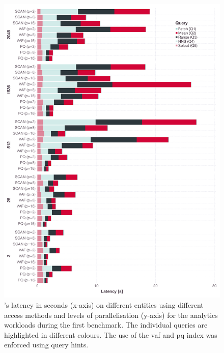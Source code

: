 \begin{figure}[p]
    \centering
    \includegraphics[width=\textwidth]{figures/analytics/analytics-cottontail-runtime}
    \caption {\cottontail{}'s latency in seconds (x-axis) on different entities using different access methods and levels of parallelisation (y-axis) for the analytics workloads during the first benchmark. The individual queries are highlighted in different colours. The use of the \acrshort{vaf} and \acrshort{pq} index was enforced using query hints.}
    \label{figure:analytics_cottontail_runtime}
\end{figure}

